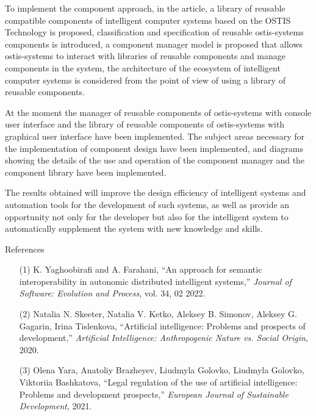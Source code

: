 \documentclass[10pt, a4paper]{article}
\begin{document}
\begin{multicols}
\justify
\quad\quad To implement the component approach, in the article, a library of reusable compatible components of intelligent computer systems based on the OSTIS Technology is proposed, classification and specification of reusable ostis-systems components is introduced, a component manager model is proposed that allows ostis-systems to interact with libraries of reusable components and manage components in the system, the architecture of the ecosystem of intelligent computer systems is considered from the point of view of using a library of reusable components.


At the moment the manager of reusable components of ostis-systems with console user interface and the library of reusable components of ostis-systems with graphical user interface have been implemented. The subject areas necessary for the implementation of component design have been implemented, and diagrams showing the details of the use and operation of the component manager and the component library have been implemented.


The results obtained will improve the design efficiency of intelligent systems and automation tools for the development of such systems, as well as provide an opportunity not only for the developer but also for the intelligent system to automatically supplement the system with new knowledge and skills.
\footnotesize
\begin{center}
    References
\end{center}
\begin{enumerate}


\item [(1)] K. Yaghoobirafi and A. Farahani, “An approach for semantic interoperability in autonomic distributed intelligent systems,” \textit{Journal of Software: Evolution and Process}, vol. 34, 02 2022.


\item [(2)] Natalia N. Skeeter, Natalia V. Ketko, Aleksey B. Simonov, Aleksey G. Gagarin, Irina Tislenkova, “Artificial intelligence: Problems and prospects of development,”\textit{ Artificial Intelligence: Anthropogenic Nature vs. Social Origin}, 2020.


\item[(3)] Olena Yara, Anatoliy Brazheyev, Liudmyla Golovko, Liudmyla Golovko, Viktoriia Bashkatova, “Legal regulation of the use of artificial intelligence: Problems and development prospects,” \textit{European Journal of Sustainable Development}, 2021.
    

\end{enumerate}
\end{multicols}
\end{document}

